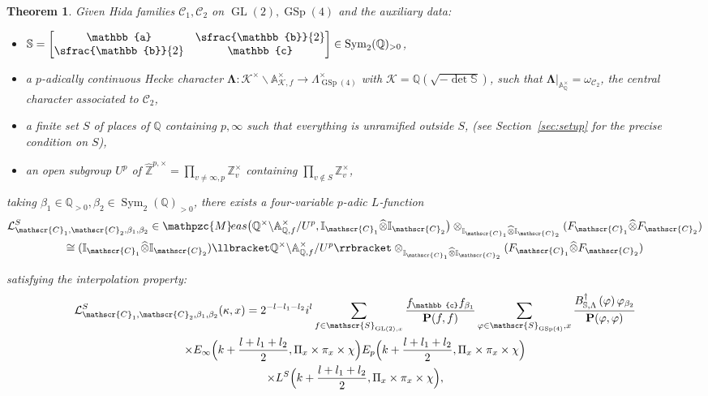 \documentclass[JEP,XML,SOM,Unicode,published]{cedram}
\newcommand{\Lfunction}{$L$\nobreakdash-func\-tion\xspace}
\theoremstyle{plain}
\newtheorem{thmintro}{Theorem}[section]
\theoremstyle{remark}
\newcommand{\bA}{\mathbb{A}}
\newcommand{\bI}{\mathbb{I}}
\newcommand{\bQ}{\mathbb{Q}}
\newcommand{\bS}{\mathbb{S}}
\newcommand{\bZ}{\mathbb{Z}}
\newcommand{\bba}{\mathbb{a}}
\newcommand{\bbb}{\mathbb{b}}
\newcommand{\bbc}{\mathbb{c}}
\newcommand{\cK}{\mathcal{K}}
\newcommand{\cL}{\mathcal{L}}
\newcommand{\sC}{\mathscr{C}}
\newcommand{\sS}{\mathscr{S}}
\newcommand{\bfP}{\mathbf{P}}
\DeclareMathOperator{\GL}{GL}
\DeclareMathOperator{\GSp}{GSp}
\newcommand{\Meas}{\mathpzc{M}\mkern-2mu eas}
\DeclareMathOperator{\Sym}{Sym}
\let\wh\widehat
\let\bes B
\let\llb\llbracket
\let\rrb\rrbracket
\newcommand{\bLam}{\boldsymbol\Lambda}
\begin{document}
\begin{thmintro}\label{thm:main}
Given Hida families $\sC_1,\sC_2$ on $\GL(2),\GSp(4)$ and the auxiliary data:
\begin{itemize}
\item
$\bS=\begin{bmatrix}\bba&\sfrac{\bbb}{2}\\ \sfrac{\bbb}{2}&\bbc\end{bmatrix}\in\Sym_2(\bQ)_{>0}$,
\item
a $p$-adically continuous Hecke character $\bLam:\cK^\times\backslash\bA^\times_{\cK,f}\to \Lambda^\times_{\GSp(4)}$ with $\cK=\bQ(\sqrt{-\det\bS})$, such that $\bLam|_{\bA^\times_\bQ}=\omega_{\sC_2}$, the central character associated to $\sC_2$,
\item
a finite set $S$ of places of $\bQ$ containing $p,\infty$ such that everything is unramified outside $S$, (see Section~\ref{sec:setup} for the precise condition on $S$),
\item
an open subgroup $U^p$ of $\hat{\bZ}^{p,\times}=\prod_{v\neq \infty,p} \bZ^\times_v$ containing $\prod_{v\notin S} \bZ^\times_v$,
\end{itemize}
taking $\beta_1\in\bQ_{>0},\beta_2\in\Sym_2(\bQ)_{>0}$, there exists a four-variable $p$-adic \Lfunction
\begin{multline*}
\cL^S_{\sC_1,\sC_2,\beta_1,\beta_2}\in\Meas\bigl(\bQ^\times\backslash\bA^\times_{\bQ,f}/U^p,\bI_{\sC_1}\wh{\otimes}\bI_{\sC_2}\bigr)\otimes_{\bI_{\sC_1}\wh{\otimes}\bI_{\sC_2}} (F_{\sC_1}\wh{\otimes}F_{\sC_2})\\
\cong (\bI_{\sC_1}\wh{\otimes}\bI_{\sC_2})\llb \bQ^\times\backslash\bA^\times_{\bQ,f}/U^p\rrb\otimes_{\bI_{\sC_1}\wh{\otimes}\bI_{\sC_2}} (F_{\sC_1}\wh{\otimes}F_{\sC_2})
\end{multline*}
\noindent
\begin{minipage}{\textwidth}
satisfying the interpolation property:
\begin{multline*}
\cL^S_{\sC_1,\sC_2,\beta_1,\beta_2}(\kappa,x)
=2^{-l-l_1-l_2}i^l\sum_{f\in \sS_{\GL(2),x}} \frac{f_{\bbc}f_{\beta_1}}{\bfP(f,f)}\sum_{\varphi\in \sS_{\GSp(4)},x} \frac{\bes^\dagger_{\bS,\Lambda}\left(\varphi\right)\varphi_{\beta_2}}{\bfP(\varphi,\varphi)} \\
\times E_\infty \Bigl(k+\frac{l+l_1+l_2}{2},\Pi_x\times\pi_x\times \chi\Bigr) E_p\Bigl(k+\frac{l+l_1+l_2}{2},\Pi_x\times\pi_x\times \chi\Bigr)\\
\times L^S\Bigl(k+\frac{l+l_1+l_2}{2},\Pi_x\times\pi_x\times \chi\Bigr),
\end{multline*}

\end{minipage}
\end{thmintro}
\end{document}
